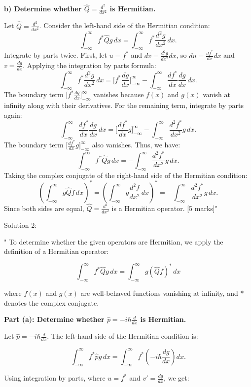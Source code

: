 \textbf{b) Determine whether $\hat{Q} = \frac{d^2}{dx^2}$ is Hermitian.}

Let $\hat{Q} = \frac{d^2}{dx^2}$. Consider the left-hand side of the Hermitian condition:
\[
\int_{-\infty}^\infty f^* \hat{Q} g \, dx = \int_{-\infty}^\infty f^* \frac{d^2 g}{dx^2} \, dx.
\]
Integrate by parts twice. First, let $u = f^*$ and $dv = \frac{d^2 g}{dx^2} dx$, so $du = \frac{df^*}{dx} dx$ and $v = \frac{dg}{dx}$. Applying the integration by parts formula:
\[
\int_{-\infty}^\infty f^* \frac{d^2 g}{dx^2} \, dx = \Big[ f^* \frac{dg}{dx} \Big]_{-\infty}^\infty - \int_{-\infty}^\infty \frac{df^*}{dx} \frac{dg}{dx} \, dx.
\]
The boundary term $\Big[ f^* \frac{dg}{dx} \Big]_{-\infty}^\infty$ vanishes because $f(x)$ and $g(x)$ vanish at infinity along with their derivatives. For the remaining term, integrate by parts again:
\[
\int_{-\infty}^\infty \frac{df^*}{dx} \frac{dg}{dx} \, dx = \Big[ \frac{df^*}{dx} g \Big]_{-\infty}^\infty - \int_{-\infty}^\infty \frac{d^2 f^*}{dx^2} g \, dx.
\]
The boundary term $\Big[ \frac{df^*}{dx} g \Big]_{-\infty}^\infty$ also vanishes. Thus, we have:
\[
\int_{-\infty}^\infty f^* \hat{Q} g \, dx = -\int_{-\infty}^\infty \frac{d^2 f^*}{dx^2} g \, dx.
\]
Taking the complex conjugate of the right-hand side of the Hermitian condition:
\[
\left(\int_{-\infty}^\infty g \hat{Q} f \, dx \right)^* = \left(\int_{-\infty}^\infty g \frac{d^2 f}{dx^2} \, dx \right)^* = -\int_{-\infty}^\infty \frac{d^2 f^*}{dx^2} g \, dx.
\]
Since both sides are equal, $\hat{Q} = \frac{d^2}{dx^2}$ is a Hermitian operator. \hfill [5 marks]"

Solution 2:

"
To determine whether the given operators are Hermitian, we apply the definition of a Hermitian operator:

\[
\int_{-\infty}^\infty f^* \hat{Q} g \, dx = \int_{-\infty}^\infty g (\hat{Q} f)^* \, dx
\]

where $f(x)$ and $g(x)$ are well-behaved functions vanishing at infinity, and $*$ denotes the complex conjugate.

\textbf{Part (a): Determine whether $\hat{p} = -i\hbar \frac{d}{dx}$ is Hermitian.}

Let $\hat{p} = -i\hbar \frac{d}{dx}$. The left-hand side of the Hermitian condition is:

\[
\int_{-\infty}^\infty f^* \hat{p} g \, dx = \int_{-\infty}^\infty f^* \left(-i\hbar \frac{d g}{dx}\right) dx.
\]

Using integration by parts, where $u = f^*$ and $v' = \frac{dg}{dx}$, we get:

